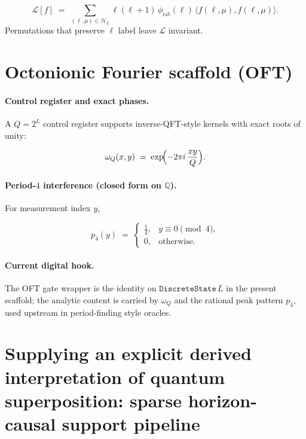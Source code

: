 \documentclass[11pt,a4paper]{article}
\theoremstyle{remark}
\begin{document}
\begin{equation}
  \mathcal{L}[f] \;=\; \sum_{(\ell,\mu)\in\mathcal{H}_L}
    \ell(\ell+1)\,\phi_{\mathrm{rat}}(\ell)\,\langle f(\ell,\mu),f(\ell,\mu)\rangle.
\end{equation}
Permutations that preserve $\ell$ label leave $\mathcal{L}$ invariant.

\section{Octonionic Fourier scaffold (OFT)}

\paragraph{Control register and exact phases.}
A $Q=2^L$ control register supports inverse-QFT-style kernels with exact roots of unity:

\begin{equation}
  \omega_{Q}(x,y) \;=\; \exp\!\Bigl(-2\pi i\,\frac{xy}{Q}\Bigr).
\end{equation}

\paragraph{Period-$4$ interference (closed form on $\mathbb{Q}$).}
For measurement index $y$,

\begin{equation}
  p_4(y) \;=\;
  \begin{cases}
    \tfrac14, & y\equiv 0 \pmod 4,\\
    0, & \text{otherwise}.
  \end{cases}
\end{equation}

\paragraph{Current digital hook.}
The OFT gate wrapper is the identity on $\texttt{DiscreteState}\,L$ in the present scaffold; the analytic content is carried by $\omega_Q$ and the rational peak pattern $p_4$, used upstream in period-finding style oracles.

\section{Supplying an explicit derived interpretation of quantum superposition: sparse horizon-causal support pipeline}
\label{sec:sparse-pipeline}
\end{document}

